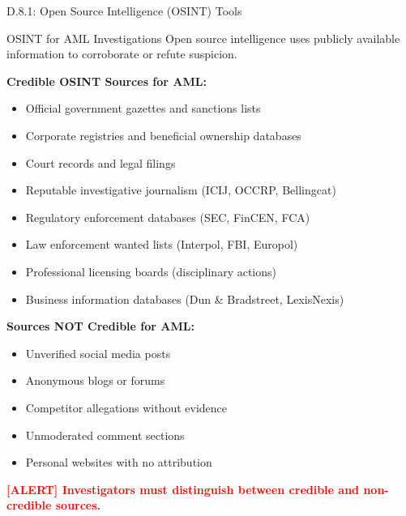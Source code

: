 \documentclass[11pt,a4paper]{beamer}
\newcommand{\redflag}[1]{\textcolor{red}{\textbf{[ALERT] #1}}}
\begin{document}
\begin{frame}{D.8.1: Open Source Intelligence (OSINT) Tools}
	\begin{block}{OSINT for AML Investigations}
		Open source intelligence uses publicly available information to corroborate or refute suspicion.
	\end{block}
	\textbf{Credible OSINT Sources for AML:}
	\begin{itemize}
		\item Official government gazettes and sanctions lists
		\item Corporate registries and beneficial ownership databases
		\item Court records and legal filings
		\item Reputable investigative journalism (ICIJ, OCCRP, Bellingcat)
		\item Regulatory enforcement databases (SEC, FinCEN, FCA)
		\item Law enforcement wanted lists (Interpol, FBI, Europol)
		\item Professional licensing boards (disciplinary actions)
		\item Business information databases (Dun \& Bradstreet, LexisNexis)
	\end{itemize}
	\textbf{Sources NOT Credible for AML:}
	\begin{itemize}
		\item Unverified social media posts
		\item Anonymous blogs or forums
		\item Competitor allegations without evidence
		\item Unmoderated comment sections
		\item Personal websites with no attribution
	\end{itemize}
	\redflag{Investigators must distinguish between credible and non-credible sources.}
\end{frame}
\end{document}
